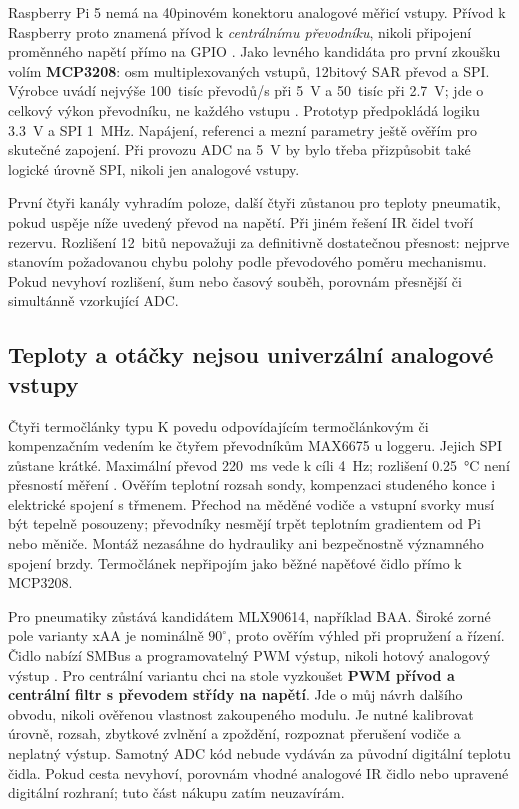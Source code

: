 Raspberry Pi 5 nemá na 40pinovém konektoru analogové měřicí vstupy.
Přívod k Raspberry proto znamená přívod k \emph{centrálnímu převodníku},
nikoli připojení proměnného napětí přímo na GPIO \cite{rpi-gpio-adc}.
Jako levného kandidáta pro první zkoušku volím \textbf{MCP3208}:
osm multiplexovaných vstupů, 12bitový SAR převod a SPI. Výrobce uvádí
nejvýše 100~tisíc převodů/s při \SI{5}{V} a 50~tisíc při
\SI{2.7}{V}; jde o celkový výkon převodníku, ne každého vstupu
\cite{mcp3208-adc}. Prototyp předpokládá logiku \SI{3.3}{V}
a SPI \SI{1}{MHz}. Napájení, referenci a mezní parametry ještě ověřím
pro skutečné zapojení. Při provozu ADC na \SI{5}{V} by bylo třeba
přizpůsobit také logické úrovně SPI, nikoli jen analogové vstupy.

První čtyři kanály vyhradím poloze, další čtyři zůstanou pro teploty
pneumatik, pokud uspěje níže uvedený převod na napětí. Při jiném řešení
IR čidel tvoří rezervu. Rozlišení 12~bitů nepovažuji za definitivně
dostatečnou přesnost: nejprve stanovím požadovanou chybu polohy podle
převodového poměru mechanismu. Pokud nevyhoví rozlišení, šum nebo
časový souběh, porovnám přesnější či simultánně vzorkující ADC.

\subsection{Teploty a otáčky nejsou univerzální analogové vstupy}

Čtyři termočlánky typu K povedu odpovídajícím termočlánkovým či
kompenzačním vedením ke čtyřem převodníkům MAX6675 u loggeru.
Jejich SPI zůstane krátké. Maximální převod \SI{220}{ms} vede k cíli
\SI{4}{Hz}; rozlišení \SI{0.25}{\degreeCelsius} není přesností měření
\cite{max6675-integrace}. Ověřím teplotní rozsah sondy, kompenzaci
studeného konce i elektrické spojení s třmenem. Přechod na měděné vodiče
a vstupní svorky musí být tepelně posouzeny; převodníky nesmějí trpět
teplotním gradientem od Pi nebo měniče. Montáž nezasáhne do hydrauliky
ani bezpečnostně významného spojení brzdy. Termočlánek nepřipojím jako
běžné napěťové čidlo přímo k MCP3208.

Pro pneumatiky zůstává kandidátem MLX90614, například BAA. Široké zorné
pole varianty xAA je nominálně $90^{\circ}$, proto ověřím výhled při
propružení a řízení. Čidlo nabízí SMBus a programovatelný PWM výstup,
nikoli hotový analogový výstup \cite{mlx90614-integrace}. Pro centrální
variantu chci na stole vyzkoušet \textbf{PWM přívod a centrální filtr
s převodem střídy na napětí}. Jde o můj návrh dalšího obvodu, nikoli
ověřenou vlastnost zakoupeného modulu. Je nutné kalibrovat úrovně,
rozsah, zbytkové zvlnění a zpoždění, rozpoznat přerušení vodiče a
neplatný výstup. Samotný ADC kód nebude vydáván za původní digitální
teplotu čidla. Pokud cesta nevyhoví, porovnám vhodné analogové IR čidlo
nebo upravené digitální rozhraní; tuto část nákupu zatím neuzavírám.

